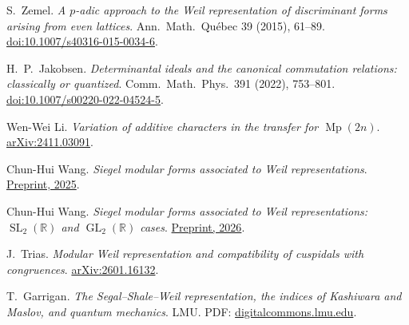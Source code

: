 \documentclass[11pt,letterpaper]{article}
\newcommand{\Mp}{\operatorname{Mp}}
\newcommand{\GL}{\operatorname{GL}}
\newcommand{\SL}{\operatorname{SL}}
\newcommand{\R}{\mathbb{R}}
\theoremstyle{plain}
\theoremstyle{definition}
\begin{document}
\begin{description}[leftmargin=1.6em,labelindent=0pt,itemsep=2pt]
\item[{[Zemel2015]}] S.~Zemel. \emph{A $p$-adic approach to the Weil representation of discriminant forms arising from even lattices}. Ann.\ Math.\ Qu\'ebec 39 (2015), 61--89. \href{https://doi.org/10.1007/s40316-015-0034-6}{doi:10.1007/s40316-015-0034-6}.
\item[{[Jakobsen2021]}] H.~P.~Jakobsen. \emph{Determinantal ideals and the canonical commutation relations: classically or quantized}. Comm.\ Math.\ Phys.\ 391 (2022), 753--801. \href{https://doi.org/10.1007/s00220-022-04524-5}{doi:10.1007/s00220-022-04524-5}.
\item[{[LiWenWei2024]}] Wen-Wei Li. \emph{Variation of additive characters in the transfer for $\Mp(2n)$}. \href{https://arxiv.org/abs/2411.03091}{arXiv:2411.03091}.
\item[{[Wang2025]}] Chun-Hui Wang. \emph{Siegel modular forms associated to Weil representations}. \href{https://www.semanticscholar.org/paper/0e902df0b61766d02a8d841e7466d9d8701c9d7d}{Preprint, 2025}.
\item[{[Wang2026]}] Chun-Hui Wang. \emph{Siegel modular forms associated to Weil representations: $\SL_2(\R)$ and $\GL_2(\R)$ cases}. \href{https://www.semanticscholar.org/paper/6352373528908c09a8009f1e1f2d775d9af06093}{Preprint, 2026}.
\item[{[Trias2026]}] J.~Trias. \emph{Modular Weil representation and compatibility of cuspidals with congruences}. \href{https://arxiv.org/abs/2601.16132}{arXiv:2601.16132}.
\item[{[Garrigan]}] T.~Garrigan. \emph{The Segal--Shale--Weil representation, the indices of Kashiwara and Maslov, and quantum mechanics}. LMU. PDF: \href{https://digitalcommons.lmu.edu/cgi/viewcontent.cgi?article=1116&context=math_fac}{digitalcommons.lmu.edu}.
\end{description}
\end{document}
